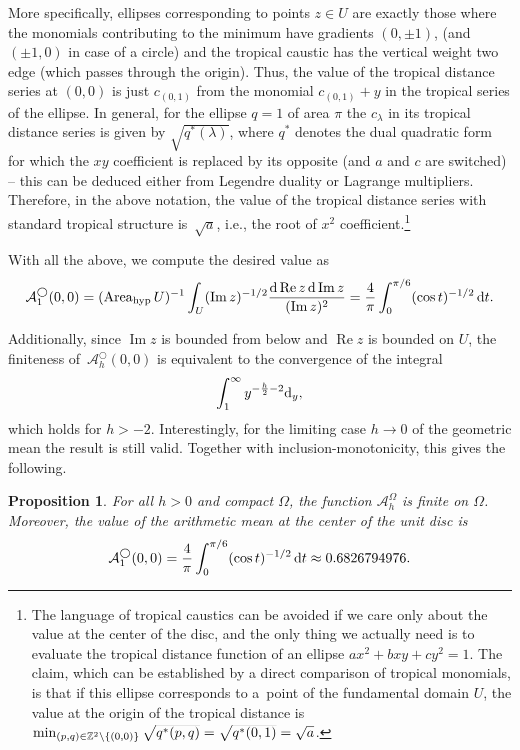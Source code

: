 \documentclass[10pt,a4paper]{amsart}
\numberwithin{equation}{section}
\newtheorem{Proposition}[Theorem]{Proposition}
\theoremstyle{definition}
\begin{document}
More specifically, ellipses corresponding to points $z\in U$ are exactly those where the monomials contributing to the minimum have gradients $(0, \pm 1)$, (and $(\pm 1,0)$ in case of a circle) and the tropical caustic has the vertical weight two edge (which passes through the origin). Thus, the value of the tropical distance series at $(0,0)$ is just $c_{(0,1)}$ from the monomial $c_{(0,1)}+y$ in the tropical series of the ellipse. In general, for the ellipse $q=1$ of area $\pi$ the $c_\lambda$ in its tropical distance series is given by $\sqrt{q^*(\lambda)}$, where $q^*$ denotes the dual quadratic form for which the $xy$ coefficient is replaced by its opposite (and $a$ and $c$ are switched) -- this can be deduced either from Legendre duality or Lagrange multipliers. Therefore, in the above notation, the value of the tropical distance series with standard tropical structure is~$\sqrt{a}$, i.e., the root of $x^2$ coefficient.\footnote{The language of tropical caustics can be avoided if we care only about the value at the center of the disc, and the only thing we actually need is to evaluate the tropical distance function of an ellipse $ax^2+bxy+cy^2=1$. The claim, which can be established by a direct comparison of tropical monomials, is that if this ellipse corresponds to a~point of the fundamental domain $U$, the value at the origin of the tropical distance is $\min_{(p,q)\in \mathbb{Z}^2\backslash\{(0,0)\}}\smash{\sqrt{q^*(p,q)}}=\smash{\sqrt{q^*(0,1)}=\sqrt{a}}$.}

With all the above, we compute the desired value as
\[
\mathcal{A}_1^\bigcirc(0,0)
=
(\operatorname{Area}_{\mathrm{hyp}} U)^{-1}
\int_U
(\operatorname{Im} z)^{-1/2}
\frac{{\rm d}\operatorname{Re} z\, {\rm d}\operatorname{Im} z}{(\operatorname{Im} z)^2}
=
\frac{4}{\pi}
\int_0^{\pi/6}
(\cos t)^{-1/2}\,{\rm d}t.
\]

Additionally, since $\operatorname{Im} z$ is bounded from below and $\operatorname{Re} z$ is bounded on $U$, the finiteness of~$\mathcal{A}_h^\bigcirc(0,0)$ is equivalent to the convergence of the integral
\[
\int_1^{\infty} y^{-\frac{h}{2}-2} {\rm d}_y,
\] which holds for $h>-2$. Interestingly, for the limiting case $h\rightarrow 0$ of the geometric mean the result is still valid. Together with inclusion-monotonicity, this gives the following.

\begin{Proposition}
For all $h>0$ and compact $\Omega$, the function $\mathcal{A}_h^\Omega$ is finite on $\Omega$. Moreover, the value of the arithmetic mean at the center of the unit disc is
\[\mathcal{A}_1^\bigcirc(0,0)=
\frac{4}{\pi}
\int_0^{\pi/6}
(\cos t)^{-1/2}\,{\rm d}t
\approx 0.6826794976.
\]
\end{Proposition}
\end{document}
